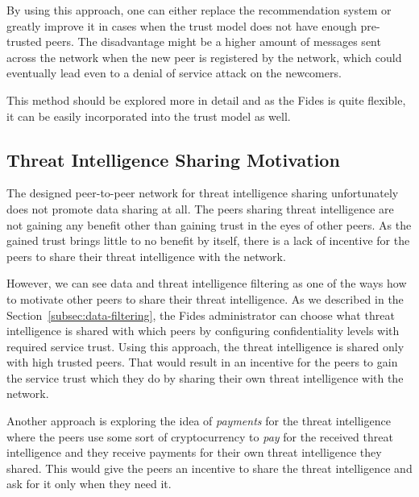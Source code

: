 By using this approach, one can either replace the recommendation system or greatly improve it in cases when the trust model does not have enough pre-trusted peers.
The disadvantage might be a higher amount of messages sent across the network when the new peer is registered by the network, which could eventually lead even to a denial of service attack on the newcomers. 

This method should be explored more in detail and as the Fides is quite flexible, it can be easily incorporated into the trust model as well.

\subsection{Threat Intelligence Sharing Motivation}
\label{subsec:threat-intelligence-sharing-motivation}
The designed peer-to-peer network for threat intelligence sharing unfortunately does not promote data sharing at all.
The peers sharing threat intelligence are not gaining any benefit other than gaining trust in the eyes of other peers.
As the gained trust brings little to no benefit by itself, there is a lack of incentive for the peers to share their threat intelligence with the network.

However, we can see data and threat intelligence filtering as one of the ways how to motivate other peers to share their threat intelligence.
As we described in the Section~\ref{subsec:data-filtering}, the Fides administrator can choose what threat intelligence is shared with which peers by configuring confidentiality levels with required service trust.
Using this approach, the threat intelligence is shared only with high trusted peers.
That would result in an incentive for the peers to gain the service trust which they do by sharing their own threat intelligence with the network.

Another approach is exploring the idea of \textit{payments} for the threat intelligence where the peers use some sort of cryptocurrency to \textit{pay} for the received threat intelligence and they receive payments for their own threat intelligence they shared.
This would give the peers an incentive to share the threat intelligence and ask for it only when they need it.